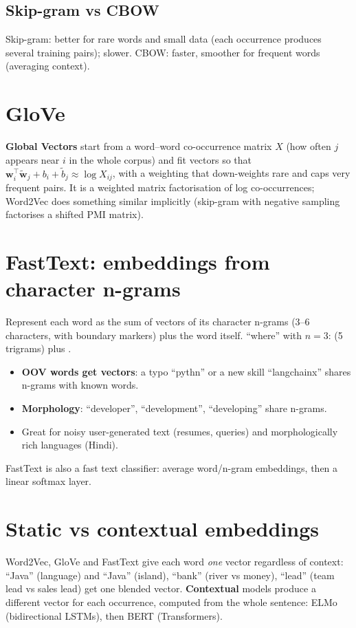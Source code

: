 \subsection{Skip-gram vs CBOW}
Skip-gram: better for rare words and small data (each occurrence produces several training pairs); slower. CBOW: faster, smoother for frequent
words (averaging context).

\section{GloVe}
\textbf{Global Vectors} start from a word--word co-occurrence matrix $X$ (how often $j$ appears near $i$ in the whole corpus) and fit vectors so
that $\mathbf w_i^\top\tilde{\mathbf w}_j + b_i + \tilde b_j\approx\log X_{ij}$, with a weighting that down-weights rare and caps very frequent pairs.
It is a weighted matrix factorisation of log co-occurrences; Word2Vec does something similar implicitly (skip-gram with negative sampling
factorises a shifted PMI matrix).

\section{FastText: embeddings from character n-grams}
Represent each word as the sum of vectors of its character n-grams (3--6 characters, with boundary markers) plus the word itself.
``where'' with $n = 3$:  (5 trigrams) plus .
\begin{itemize}
\item \textbf{OOV words get vectors}: a typo ``pythn'' or a new skill ``langchainx'' shares n-grams with known words.
\item \textbf{Morphology}: ``developer'', ``development'', ``developing'' share n-grams.
\item Great for noisy user-generated text (resumes, queries) and morphologically rich languages (Hindi).
\end{itemize}
FastText is also a fast text classifier: average word/n-gram embeddings, then a linear softmax layer.

\section{Static vs contextual embeddings}
Word2Vec, GloVe and FastText give each word \emph{one} vector regardless of context: ``Java'' (language) and ``Java'' (island), ``bank'' (river vs
money), ``lead'' (team lead vs sales lead) get one blended vector. \textbf{Contextual} models produce a different vector for each occurrence,
computed from the whole sentence: ELMo (bidirectional LSTMs), then BERT (Transformers).

